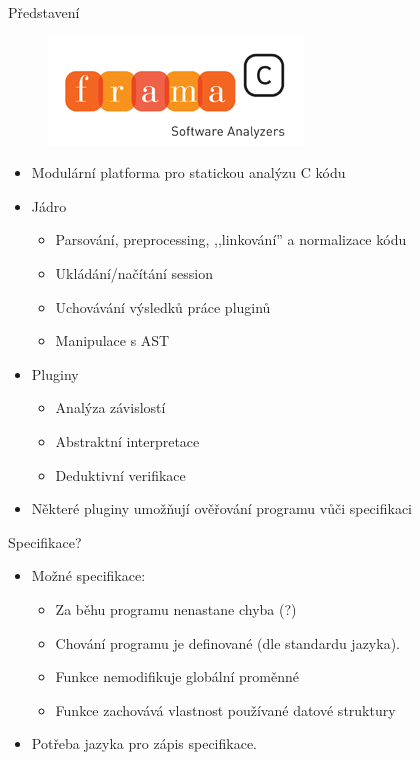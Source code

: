 \documentclass[11pt]{beamer}
\begin{document}
\begin{frame}{Představení}

\begin{figure}
	\includegraphics[scale=0.3]{frama-c.png}
\end{figure}

\begin{itemize}
	\item<1-> Modulární platforma pro statickou analýzu C kódu
	\item<2-> Jádro
		\begin{itemize}
				\item<4-> Parsování, preprocessing, ,,linkování'' a normalizace kódu
				\item<5-> Ukládání/načítání session
				\item<6-> Uchovávání výsledků práce pluginů
				\item<7-> Manipulace s AST
		\end{itemize}
	\item<3-> Pluginy
		\begin{itemize}
				\item<8-> Analýza závislostí
				\item<9-> Abstraktní interpretace
				\item<10-> Deduktivní verifikace
		\end{itemize}
	\item<11-> Některé pluginy umožňují ověřování programu vůči specifikaci
\end{itemize}

\end{frame}

\begin{frame}{Specifikace?}
	\begin{itemize}
		\item Možné specifikace:
			\begin{itemize}
				\pause \item Za běhu programu nenastane chyba \pause (?)
				\pause \item Chování programu je definované (dle standardu jazyka).
				\pause \item Funkce nemodifikuje globální proměnné
				\pause \item Funkce zachovává vlastnost používané datové struktury
			\end{itemize}
		\pause \item Potřeba jazyka pro zápis specifikace.
	\end{itemize}
\end{frame}
\end{document}
